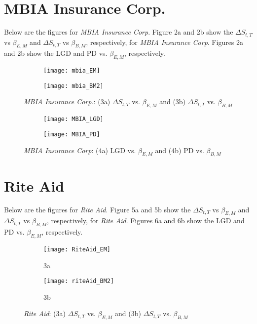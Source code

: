 \documentclass[12pt, two-sided]{article}
\begin{document}
\section{MBIA Insurance Corp.}

Below are the figures for \emph{MBIA Insurance Corp}. Figure 2a and 2b show the $\Delta S_{t,T}$ vs $\beta_{E,M}$  and $\Delta S_{t,T}$ vs $\beta_{B,M}$, respectively, for \emph{MBIA Insurance Corp}. Figures 2a and 2b show the LGD and PD vs. $\beta_{E,M}$, respectively. 

\begin{figure}[H]
\begin{subfigure}{.5\textwidth}
  \centering
  \texttt{[image: mbia\_EM]}
  \caption{}
\end{subfigure}
\begin{subfigure}{.5\textwidth}
  \centering
  \texttt{[image: mbia\_BM2]}
  \caption{}
\end{subfigure}
\caption{\emph{MBIA Insurance Corp.}: (3a)  $\Delta S_{t,T}$ vs. $\beta_{E,M}$
			  and (3b)  $\Delta S_{t,T}$ vs. $\beta_{B,M}$}
\label{fig:fig}
\end{figure}

\begin{figure}[H]
\begin{subfigure}{0.5\textwidth}
  \centering
  \texttt{[image: MBIA\_LGD]}
  \caption{}
\end{subfigure}%
\begin{subfigure}{.5\textwidth}
  \centering
  \texttt{[image: MBIA\_PD]}
  \caption{}
\end{subfigure}
\caption{\emph{MBIA Insurance Corp}: (4a)  LGD vs. $\beta_{E,M}$
			  and (4b) PD vs. $\beta_{B,M}$}
\end{figure}

\section{Rite Aid}

Below are the figures for \emph{Rite Aid}. Figure 5a and 5b show the $\Delta S_{t,T}$ vs $\beta_{E,M}$  and $\Delta S_{t,T}$ vs $\beta_{B,M}$, respectively, for \emph{Rite Aid}. Figures 6a and 6b show the LGD and PD vs. $\beta_{E,M}$, respectively. 

\begin{figure}[H]
\begin{subfigure}{.5\textwidth}
  \centering
  \texttt{[image: RiteAid\_EM]}
  \caption{3a}
\end{subfigure}
\begin{subfigure}{.5\textwidth}
  \centering
  \texttt{[image: riteAid\_BM2]}
  \caption{3b}
\end{subfigure}
\caption{\emph{Rite Aid}: (3a)  $\Delta S_{t,T}$ vs. $\beta_{E,M}$
			  and (3b)  $\Delta S_{t,T}$ vs. $\beta_{B,M}$}
\label{fig:fig}
\end{figure}
\end{document}
